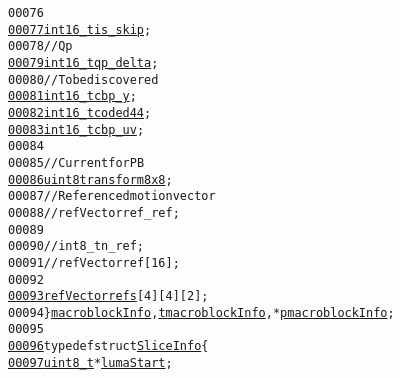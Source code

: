 \begin{footnotesize}
\begin{alltt}
00076 
\hypertarget{_types_8h_source_l00077}{}\hyperlink{structmacroblock_info_ad7cf6f2dc254dc14005ab5705bde6349}{00077}         \hyperlink{_types_8h_ae615613535a2b2445773922f5d45a861}{int16_t} \hyperlink{structmacroblock_info_ad7cf6f2dc254dc14005ab5705bde6349}{is_skip};
00078         \textcolor{comment}{// Qp}
\hypertarget{_types_8h_source_l00079}{}\hyperlink{structmacroblock_info_a732ef45ea0429985a3833fc7a93bf9fd}{00079}         \hyperlink{_types_8h_ae615613535a2b2445773922f5d45a861}{int16_t} \hyperlink{structmacroblock_info_a732ef45ea0429985a3833fc7a93bf9fd}{qp_delta};
00080         \textcolor{comment}{// To be discovered}
\hypertarget{_types_8h_source_l00081}{}\hyperlink{structmacroblock_info_a39296ecdc137fb62501453716a0330ac}{00081}         \hyperlink{_types_8h_ae615613535a2b2445773922f5d45a861}{int16_t} \hyperlink{structmacroblock_info_a39296ecdc137fb62501453716a0330ac}{cbp_y};
\hypertarget{_types_8h_source_l00082}{}\hyperlink{structmacroblock_info_a8c2dc78f061142480ef5b2026b8a1dff}{00082}         \hyperlink{_types_8h_ae615613535a2b2445773922f5d45a861}{int16_t} \hyperlink{structmacroblock_info_a8c2dc78f061142480ef5b2026b8a1dff}{coded44};
\hypertarget{_types_8h_source_l00083}{}\hyperlink{structmacroblock_info_ae4618a11a8f0f396fb05879125bc449a}{00083}         \hyperlink{_types_8h_ae615613535a2b2445773922f5d45a861}{int16_t} \hyperlink{structmacroblock_info_ae4618a11a8f0f396fb05879125bc449a}{cbp_uv};
00084 
00085         \textcolor{comment}{// Current for PB}
\hypertarget{_types_8h_source_l00086}{}\hyperlink{structmacroblock_info_a0f244dcaf8b80e1f8adc3973e34e0a25}{00086}         \hyperlink{_types_8h_adde6aaee8457bee49c2a92621fe22b79}{uint8} \hyperlink{structmacroblock_info_a0f244dcaf8b80e1f8adc3973e34e0a25}{transform8x8};
00087         \textcolor{comment}{// Referenced motion vector}
00088         \textcolor{comment}{//refVector ref\_ref;}
00089 
00090 \textcolor{comment}{//      int8\_t n\_ref;}
00091 \textcolor{comment}{//      refVector ref[16];}
00092 
\hypertarget{_types_8h_source_l00093}{}\hyperlink{structmacroblock_info_a8501600ad3ab8d7865c28c8398e900f9}{00093}         \hyperlink{structref_vector}{refVector} \hyperlink{structmacroblock_info_a8501600ad3ab8d7865c28c8398e900f9}{refs}[4][4][2];
00094 \} \hyperlink{structmacroblock_info}{macroblockInfo}, \hyperlink{structmacroblock_info}{tmacroblockInfo}, *\hyperlink{structmacroblock_info}{pmacroblockInfo};
00095 
\hypertarget{_types_8h_source_l00096}{}\hyperlink{struct_slice_info}{00096} \textcolor{keyword}{typedef} \textcolor{keyword}{struct }\hyperlink{struct_slice_info}{SliceInfo} \{
\hypertarget{_types_8h_source_l00097}{}\hyperlink{struct_slice_info_a198bba28ea6d348fc54ca0ed8d94896e}{00097}         \hyperlink{_types_8h_a363e4d606232036a6b89060813c45489}{uint8_t} *       \hyperlink{struct_slice_info_a198bba28ea6d348fc54ca0ed8d94896e}{lumaStart};

\end{alltt}
\end{footnotesize}
